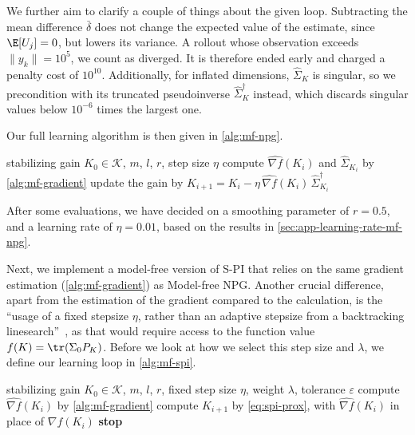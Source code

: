 We further aim to clarify a couple of things about the given loop.
Subtracting the mean difference $\bar{\delta}$ does not change the expected value of the estimate, since
$\E[U_j] = 0$, but lowers its variance. A rollout whose observation exceeds $\lVert y_k \rVert = 10^{5}$,
we count as diverged. It is therefore ended early and charged a penalty cost of $10^{10}$. 
Additionally, for inflated dimensions, $\hat{\Sigma}_K$ is singular, so we precondition with its
truncated pseudoinverse $\hat{\Sigma}_K^{\dagger}$ instead, which discards singular values below $10^{-6}$ times the largest one.

Our full learning algorithm is then given in \cref{alg:mf-npg}.
\begin{algorithm}[htbp]
    \caption{Model-free NPG}
    \label{alg:mf-npg}
    \begin{algorithmic}[1]
        \REQUIRE stabilizing gain $K_0 \in \mathcal{K}$, $m$, $l$, $r$, step size $\eta$
            \STATE compute $\widehat{\nabla f}(K_i)$ and $\hat{\Sigma}_{K_i}$ by \cref{alg:mf-gradient}
            \STATE update the gain by $K_{i+1} = K_i - \eta \, \widehat{\nabla f}(K_i) \, \hat{\Sigma}_{K_i}^{\dagger}$
        \ENDFOR
    \end{algorithmic}
\end{algorithm}

After some evaluations, we have decided on a smoothing parameter of $r = 0.5$, and a learning rate of $\eta = 0.01$, based
on the results in \cref{sec:app-learning-rate-mf-npg}.

Next, we implement a model-free version of S-PI that relies on the same gradient
estimation (\cref{alg:mf-gradient}) as Model-free NPG. Another crucial difference,
apart from the estimation of the gradient compared to the calculation, is the ``usage of a fixed stepsize
$\eta$, rather than an adaptive stepsize from a backtracking linesearch''~\cite[Sec.~3.1]{Park2020Structured}, as that
would require access to the function value $f(K) = \tr(\Sigma_0 P_K)$. Before we look at how we select this step size
and $\lambda$, we define our learning loop in \cref{alg:mf-spi}.
\begin{algorithm}[htbp]
    \caption{S-PI (model-free)}
    \label{alg:mf-spi}
    \begin{algorithmic}[1]
        \REQUIRE stabilizing gain $K_0 \in \mathcal{K}$, $m$, $l$, $r$, fixed step size $\eta$, weight $\lambda$,
        tolerance $\varepsilon$
            \STATE compute $\widehat{\nabla f}(K_i)$ by \cref{alg:mf-gradient}
            \STATE compute $K_{i+1}$ by \eqref{eq:spi-prox}, with $\widehat{\nabla f}(K_i)$ in place of $\nabla f(K_i)$
                \STATE \textbf{stop}
            \ENDIF
        \ENDFOR
    \end{algorithmic}
\end{algorithm}

